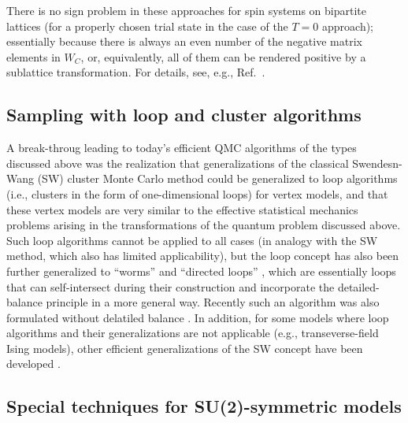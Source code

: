 \documentclass[range]{ar2e}
\begin{document}
There is no sign problem in these approaches for spin systems on bipartite lattices (for a properly chosen trial state in the case of the $T=0$ approach); 
essentially because there is always an even number of the negative matrix elements in $W_C$, or, equivalently, all of them can be rendered positive by a 
sublattice transformation. For details, see, e.g., Ref.~\cite{Henelius00}.

\subsection{Sampling with loop and cluster algorithms}

A break-throug leading to today's efficient QMC algorithms of the types discussed above
was the realization \cite{Evertz93} that generalizations of the classical Swendesn-Wang (SW) cluster 
Monte Carlo method \cite{Swendsen88} could be generalized to loop algorithms (i.e., clusters in the form of one-dimensional loops) for vertex models, and that 
these vertex models are very similar to the effective statistical mechanics problems arising in the transformations of the quantum problem discussed above. Such 
loop algorithms cannot be applied to all cases (in analogy with the SW method, which also has limited applicability), but the loop concept has also been further 
generalized to ``worms'' \cite{Prokofev96,Prokofev98, WormA} and ``directed loops'' \cite{Sandvik99,Syljuasen02}, which are essentially loops that can self-intersect
during their construction and incorporate the detailed-balance principle in a more general way. Recently such an algorithm was also formulated without
delatiled balance \cite{Suwa10}. In addition, for some models where loop algorithms and their generalizations are not applicable (e.g., transeverse-field 
Ising models), other efficient generalizations of the SW concept have been developed \cite{Rieger99,Sandvik03}.

\subsection{Special techniques for SU(2)-symmetric models}
\end{document}
